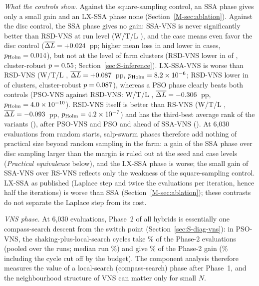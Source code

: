 \documentclass[10pt]{article}
\begin{document}
\emph{What the controls show.} Against the square-sampling control, an SSA phase gives only a small gain and an LX-SSA phase none (Section~\ref{M-sec:ablation}). %
Against the disc control, the SSA phase gives no gain: SSA-VNS is never significantly better than RSD-VNS at run level (W/T/L \NAblSSAVNSvsRSDVNS), and the case means even favor the disc control ($\overline{\Delta L}=+0.024$~pp; higher mean loss in \NCmSSAVNSvsRSDVNSLosses{} and lower in \NCmSSAVNSvsRSDVNSWins{} cases, $p_{\rm Holm}=0.014$), but not at the level of farm clusters (RSD-VNS lower in \NXClSSAVNSvsRSDVNSOpp{} of \NXClustersNum, cluster-robust $p=0.55$; Section~\ref{sec:S-inference}). %
 LX-SSA-VNS is worse than RSD-VNS (W/T/L \NAblLXSSAVNSvsRSDVNS, $\overline{\Delta L}=+0.087$~pp, $p_{\rm Holm}=8.2\times10^{-6}$; RSD-VNS lower in \NXClLXSSAVNSvsRSDVNSOpp{} of \NXClustersNum{} clusters, cluster-robust $p=0.087$), %
whereas a PSO phase clearly beats both controls (PSO-VNS against RSD-VNS: W/T/L \NAblPSOVNSvsRSDVNS, $\overline{\Delta L}=-0.306$~pp, $p_{\rm Holm}=4.0\times10^{-10}$). %
RSD-VNS itself is better than RS-VNS (W/T/L \NAblRSDVNSvsRSVNS, $\overline{\Delta L}=-0.093$~pp, $p_{\rm Holm}=4.2\times10^{-7}$) and has the third-best average rank of the \NAblNVar{} variants (\NAblRankRSDVNS), after PSO-VNS and PSO and ahead of SSA-VNS (\NAblRankSSAVNS). %
At 6,030 evaluations from random starts, salp-swarm phases therefore add nothing of practical size beyond random sampling in the farm: a gain of the SSA phase over disc sampling larger than the margin is ruled out at the seed and case levels (\emph{Practical equivalence} below), and the LX-SSA phase is worse; the small gain of SSA-VNS over RS-VNS reflects only the weakness of the square-sampling control. LX-SSA as published (Laplace step and twice the evaluations per iteration, hence half the iterations) is worse than SSA (Section~\ref{M-sec:ablation}); these contrasts do not separate the Laplace step from its cost. %

\emph{VNS phase.} At 6,030 evaluations, Phase~2 of all hybrids is essentially one compass-search descent from the switch point (Section~\ref{sec:S-diag-vns}): in PSO-VNS, the shaking-plus-local-search cycles take \NDCycleEvalsPctPSOVNS\% of the Phase-2 evaluations (pooled over the runs; median run \NDCycleEvalsPctMedianPSOVNS\%) and give \NDCycleSharePSOVNS\% of the Phase-2 gain (\NDCycleAllSharePSOVNS\% including the cycle cut off by the budget). The component analysis therefore measures the value of a local-search (compass-search) phase after Phase~1, and the neighbourhood structure of VNS can matter only for small $N$. %
\end{document}
